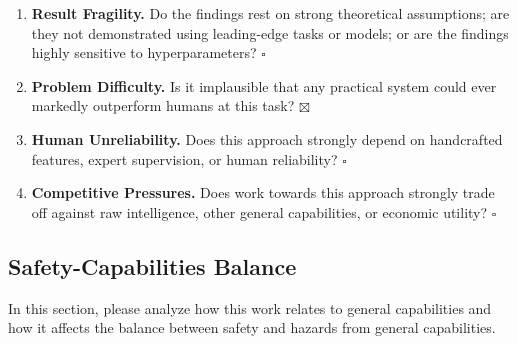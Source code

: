 \begin{enumerate}
\item \textbf{Result Fragility.} Do the findings rest on strong theoretical assumptions; are they not demonstrated using leading-edge tasks or models; or are the findings highly sensitive to hyperparameters? \hfill
$\square$
\item \textbf{Problem Difficulty.} Is it implausible that any practical system could ever markedly outperform humans at this task? \hfill $\boxtimes$
\item \textbf{Human Unreliability.} Does this approach strongly depend on handcrafted features, expert supervision, or human reliability? \hfill $\square$
\item \textbf{Competitive Pressures.} Does work towards this approach strongly trade off against raw intelligence, other general capabilities, or economic utility? \hfill $\square$
\end{enumerate}

\subsection{Safety-Capabilities Balance}
In this section, please analyze how this work relates to general capabilities and how it affects the balance between safety and hazards from general capabilities.

